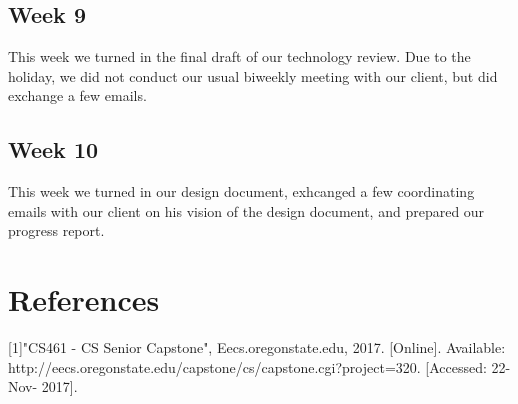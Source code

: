 \documentclass[onecolumn, draftclsnofoot,10pt, compsoc]{IEEEtran}
\begin{document}
\subsection{Week 9}

This week we turned in the final draft of our technology review. Due to the holiday, we did not conduct our usual biweekly meeting with our client, but did exchange a few emails.

\subsection{Week 10}

This week we turned in our design document, exhcanged a few coordinating emails with our client on his vision of the design document, and prepared our progress report.

\section{References}

[1]"CS461 - CS Senior Capstone", Eecs.oregonstate.edu, 2017. [Online]. Available: http://eecs.oregonstate.edu/capstone/cs/capstone.cgi?project=320. [Accessed: 22- Nov- 2017].
\end{document}
